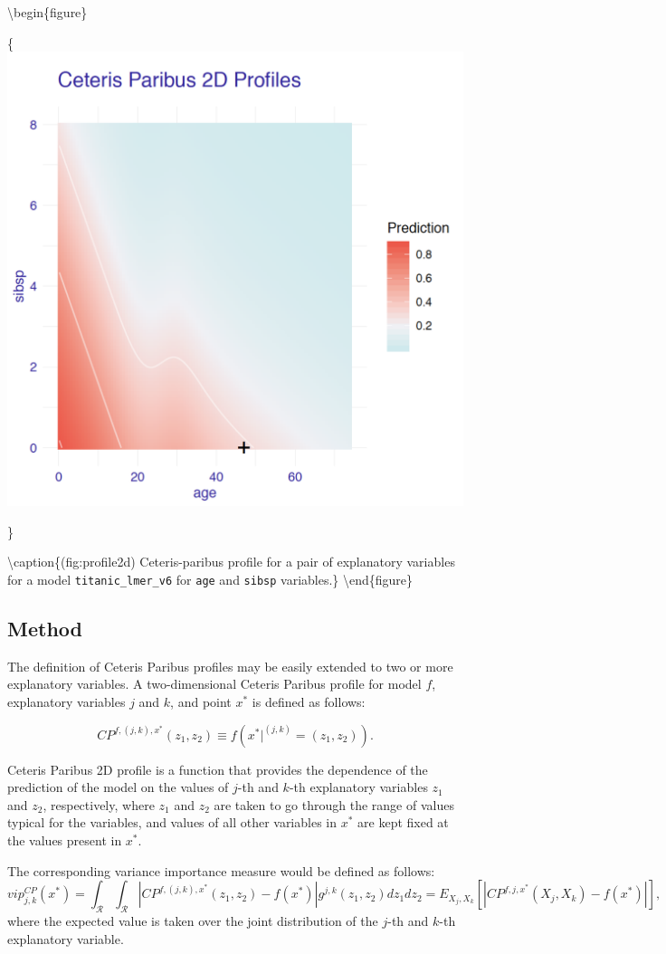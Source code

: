 \documentclass[12pt,]{krantz}
\theoremstyle{definition}
\theoremstyle{definition}
\theoremstyle{definition}
\theoremstyle{remark}
\begin{document}
\textbackslash{}begin\{figure\}

\{\centering \includegraphics[width=0.7\linewidth]{figure/profile_2d}

\}

\textbackslash{}caption\{(fig:profile2d) Ceteris-paribus profile for a
pair of explanatory variables for a model \texttt{titanic\_lmer\_v6} for
\texttt{age} and \texttt{sibsp} variables.\}\label{fig:profile2d}
\textbackslash{}end\{figure\}

\hypertarget{method-2}{%
\subsection{Method}\label{method-2}}

The definition of Ceteris Paribus profiles may be easily extended to two
or more explanatory variables. A two-dimensional Ceteris Paribus profile
for model \(f\), explanatory variables \(j\) and \(k\), and point
\(x^*\) is defined as follows:

\[
CP^{f, (j,k), x^*}(z_1, z_2) \equiv f(x^*|^{(j,k)} = (z_1,z_2)).
\]

Ceteris Paribus 2D profile is a function that provides the dependence of
the prediction of the model on the values of \(j\)-th and \(k\)-th
explanatory variables \(z_1\) and \(z_2\), respectively, where \(z_1\)
and \(z_2\) are taken to go through the range of values typical for the
variables, and values of all other variables in \(x^*\) are kept fixed
at the values present in \(x^*\).

The corresponding variance importance measure would be defined as
follows: \[
vip^{CP}_{j,k}(x^*) = \int_{\mathcal R}\int_{\mathcal R} |CP^{f,(j,k),x^*}(z_1,z_2) - f(x^*)| g^{j,k}(z_1,z_2)dz_1dz_2=E_{X_j,X_k}[|CP^{f,j,x^*}(X_j,X_k) - f(x^*)|],
\] where the expected value is taken over the joint distribution of the
\(j\)-th and \(k\)-th explanatory variable.
\end{document}
